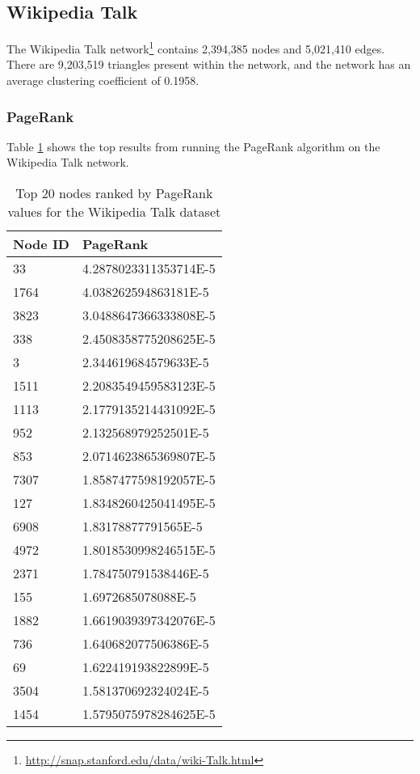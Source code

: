 \subsection{Wikipedia Talk}
The Wikipedia Talk network\footnote{\url{http://snap.stanford.edu/data/wiki-Talk.html}} contains 2,394,385 nodes and 5,021,410 edges. There are 9,203,519 triangles present within the network, and the network has an average clustering coefficient of 0.1958.

\subsubsection{PageRank}
Table \ref{tab:wikitalkpr} shows the top results from running the PageRank algorithm on the Wikipedia Talk network.

\begin{table}%
\centering
\begin{tabular}{|l|l|}
\hline
Node ID & PageRank \\
\hline
33 & 4.2878023311353714E-5 \\
1764 & 4.038262594863181E-5 \\
3823 & 3.0488647366333808E-5 \\
338 & 2.4508358775208625E-5 \\
3 & 2.344619684579633E-5 \\
1511 & 2.2083549459583123E-5 \\
1113 & 2.1779135214431092E-5 \\
952 & 2.132568979252501E-5 \\
853 & 2.0714623865369807E-5 \\
7307 & 1.8587477598192057E-5 \\
127 & 1.8348260425041495E-5 \\
6908 & 1.83178877791565E-5 \\
4972 & 1.8018530998246515E-5 \\
2371 & 1.784750791538446E-5 \\
155 & 1.6972685078088E-5 \\
1882 & 1.6619039397342076E-5 \\
736 & 1.640682077506386E-5 \\
69 & 1.622419193822899E-5 \\
3504 & 1.581370692324024E-5 \\
1454 & 1.5795075978284625E-5 \\
\hline
\end{tabular}
\caption{Top 20 nodes ranked by PageRank values for the Wikipedia Talk dataset}
\label{tab:wikitalkpr}
\end{table}

